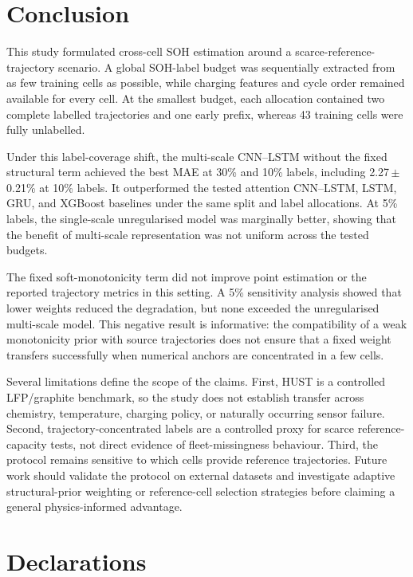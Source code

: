 \documentclass[pdflatex,sn-mathphys-num]{sn-jnl}
\begin{document}
\section{Conclusion}
\label{sec:conclusion}

This study formulated cross-cell SOH estimation around a scarce-reference-trajectory scenario. A global SOH-label budget was sequentially extracted from as few training cells as possible, while charging features and cycle order remained available for every cell. At the smallest budget, each allocation contained two complete labelled trajectories and one early prefix, whereas 43 training cells were fully unlabelled.

Under this label-coverage shift, the multi-scale CNN--LSTM without the fixed structural term achieved the best MAE at 30\% and 10\% labels, including 2.27\,$\pm$\,0.21\% at 10\% labels. It outperformed the tested attention CNN--LSTM, LSTM, GRU, and XGBoost baselines under the same split and label allocations. At 5\% labels, the single-scale unregularised model was marginally better, showing that the benefit of multi-scale representation was not uniform across the tested budgets.

The fixed soft-monotonicity term did not improve point estimation or the reported trajectory metrics in this setting. A 5\% sensitivity analysis showed that lower weights reduced the degradation, but none exceeded the unregularised multi-scale model. This negative result is informative: the compatibility of a weak monotonicity prior with source trajectories does not ensure that a fixed weight transfers successfully when numerical anchors are concentrated in a few cells.

Several limitations define the scope of the claims. First, HUST is a controlled LFP/graphite benchmark, so the study does not establish transfer across chemistry, temperature, charging policy, or naturally occurring sensor failure. Second, trajectory-concentrated labels are a controlled proxy for scarce reference-capacity tests, not direct evidence of fleet-missingness behaviour. Third, the protocol remains sensitive to which cells provide reference trajectories. Future work should validate the protocol on external datasets and investigate adaptive structural-prior weighting or reference-cell selection strategies before claiming a general physics-informed advantage.

\backmatter

\section*{Declarations}
\end{document}
